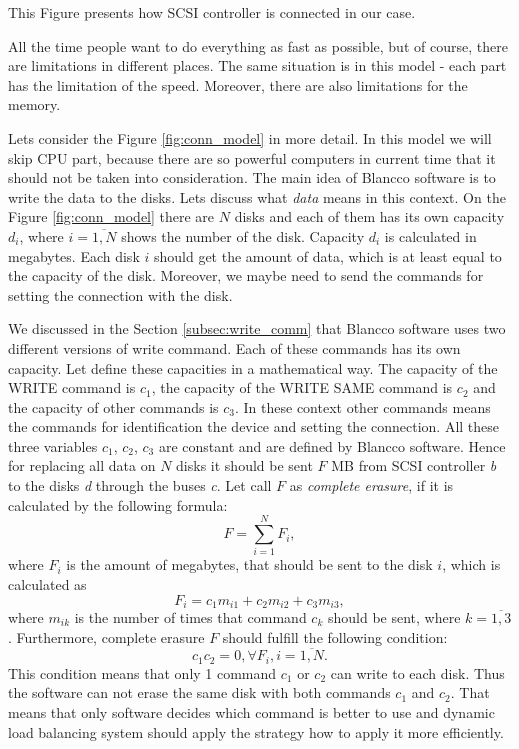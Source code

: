 This Figure presents how SCSI controller is connected in our case.  

All the time people want to do everything as fast as possible, but of course, there are limitations in different places. The same situation is in this model - each part has the limitation of the speed. Moreover, there are also limitations for the memory.


Lets consider the Figure \ref{fig:conn_model} in more detail. In this model we will skip CPU part, because there are so powerful computers in current time that it should not be taken into consideration. The main idea of Blancco software is to write the data to the disks. Lets discuss what \emph{data} means in this context. On the Figure \ref{fig:conn_model} there are $N$ disks and each of them has its own capacity $d_i$, where $i=\overline{1,N}$ shows the number of the disk. Capacity $d_i$ is calculated in megabytes. Each disk $i$ should get the amount of data, which is at least equal to the capacity of the disk. Moreover, we maybe need to send the commands for setting the connection with the disk. 


We discussed in the Section \ref{subsec:write_comm} that Blancco software uses two different versions of write command. Each of these commands has its own capacity. Let define these capacities in a mathematical way. The capacity of the WRITE command is $c_1$, the capacity of the WRITE SAME command is $c_2$ and the capacity of other commands is $c_3$. In these context other commands means the commands for identification the device and setting the connection. All these three variables $c_1$, $c_2$, $c_3$ are constant and are defined by Blancco software. Hence for replacing all data on $N$ disks it should be sent $F$ MB from SCSI controller \emph{b} to the disks \emph{d} through the buses \emph{c}. Let call $F$ as \emph{complete erasure}, if it is calculated by the following formula:
\begin{equation}
\label{eq:comp_erasure}
	F = \sum_{i=1}^{N}F_i,
\end{equation}
where $F_i$ is the amount of megabytes, that should be sent to the disk $i$, which is calculated as
\begin{equation}
	F_i = c_1 m_{i1} + c_2 m_{i2} + c_3 m_{i3},
\end{equation}
where $m_{ik}$ is the number of times that command $c_k$ should be sent, where $k=\overline{1,3}$. Furthermore, complete erasure $F$ should fulfill the following condition:
\begin{equation}
\label{eq:write_cond}
	c_1 c_2 = 0, \forall F_i, i=\overline{1,N}.
\end{equation}
This condition means that only 1 command $c_1$ or $c_2$ can write to each disk. Thus the software can not erase the same disk with both commands $c_1$ and $c_2$. That means that only software decides which command is better to use and dynamic load balancing system should apply the strategy how to apply it more efficiently.


